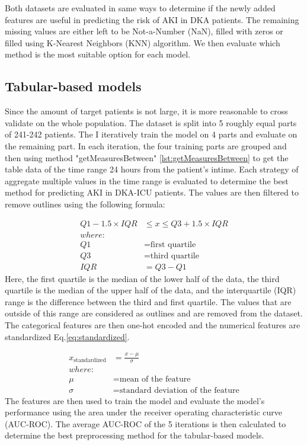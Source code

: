 \documentclass[../main.tex]{subfiles}
\begin{document}
Both datasets are evaluated in same ways to determine if the newly added features are useful in predicting the risk of AKI in DKA patients.
The remaining missing values are either left to be Not-a-Number (NaN), filled with zeros or filled using K-Nearest Neighbors (KNN) algorithm.
We then evaluate which method is the most suitable option for each model.


\subsection{Tabular-based models}

Since the amount of target patients is not large, it is more reasonable to cross validate on the whole population.
The dataset is split into 5 roughly equal parts of 241-242 patients.
The I iteratively train the model on 4 parts and evaluate on the remaining part.
In each iteration, the four training parts are grouped and then using method "getMeasuresBetween" \ref{lst:getMeasuresBetween} to get the table data of the time range 24 hours from the patient's intime.
Each strategy of aggregate multiple values in the time range is evaluated to determine the best method for predicting AKI in DKA-ICU patients.
The values are then filtered to remove outlines using the following formula:

\begin{equation}
    \begin{aligned}
        Q1 - 1.5 \times IQR &\leq x \leq Q3 + 1.5 \times IQR \\
        where: \\
        Q1 &= \text{first quartile} \\
        Q3 &= \text{third quartile} \\
        IQR &= Q3 - Q1
    \end{aligned}
\end{equation}
Here, the first quartile is the median of the lower half of the data, the third quartile is the median of the upper half of the data, and the interquartile (IQR) range is the difference between the third and first quartile.
The values that are outside of this range are considered as outlines and are removed from the dataset.
The categorical features are then one-hot encoded and the numerical features are standardized Eq.\ref{eq:standardized}.

\begin{equation}
    \label{eq:standardized}
    \begin{aligned}
        x_{\text{standardized}} &= \frac{x - \mu}{\sigma} \\
        where: \\
        \mu &= \text{mean of the feature} \\
        \sigma &= \text{standard deviation of the feature}
    \end{aligned}
\end{equation}
The features are then used to train the model and evaluate the model's performance using the area under the receiver operating characteristic curve (AUC-ROC).
The average AUC-ROC of the 5 iterations is then calculated to determine the best preprocessing method for the tabular-based models.
\end{document}
